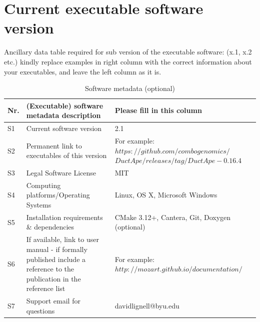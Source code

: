 \documentclass[preprint,12pt, a4paper]{elsarticle}
\begin{document}

 
 

\section*{Current executable software version}
\label{software_version}

Ancillary data table required for sub version of the executable software: (x.1, x.2 etc.) kindly replace examples in right column with the correct information about your executables, and leave the left column as it is.

\begin{table}[!h]
\begin{tabular}{|l|p{6.5cm}|p{6.5cm}|}
\hline
\textbf{Nr.} & \textbf{(Executable) software metadata description} & \textbf{Please fill in this column} \\
\hline
S1 & Current software version & 2.1 \\
\hline
S2 & Permanent link to executables of this version  & For example: $https://github.com/combogenomics/$ $DuctApe/releases/tag/DuctApe-0.16.4$ \\
\hline
S3 & Legal Software License & MIT \\
\hline
S4 & Computing platforms/Operating Systems & Linux, OS X, Microsoft Windows\\
\hline
S5 & Installation requirements \& dependencies & CMake 3.12+, Cantera, Git, Doxygen (optional) \\
\hline
S6 & If available, link to user manual - if formally published include a reference to the publication in the reference list & For example: $http://mozart.github.io/documentation/$ \\
\hline
S7 & Support email for questions & davidlignell@byu.edu \\
\hline
\end{tabular}
\caption{Software metadata (optional)}
\end{table}
\end{document}
